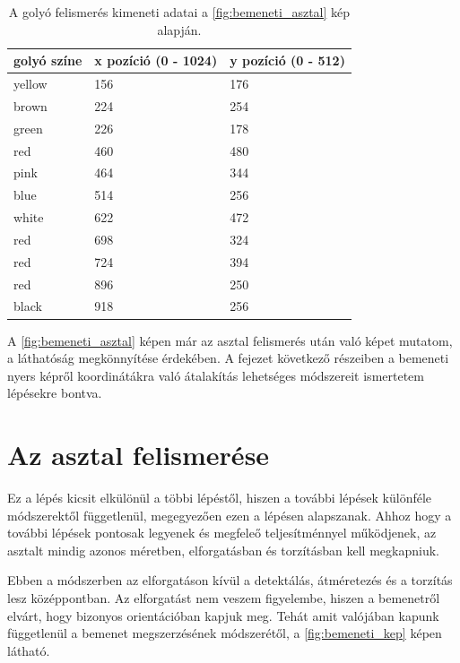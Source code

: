 \begin{table}[!ht]
    \caption{A golyó felismerés kimeneti adatai a \ref{fig:bemeneti_asztal} kép alapján.}
    \label{tab:felismert_koordinatak}
	\footnotesize
	\centering
	\begin{tabular}{ l l l }
		\toprule
		golyó színe & x pozíció (0 - 1024) & y pozíció (0 - 512) \\
		\midrule
		yellow & 156 & 176\\
        brown  & 224 & 254\\
        green  & 226 & 178\\
        red    & 460 & 480\\
        pink   & 464 & 344\\
        blue   & 514 & 256\\
        white  & 622 & 472\\
        red    & 698 & 324\\
        red    & 724 & 394\\
        red    & 896 & 250\\
        black  & 918 & 256\\
		\bottomrule
	\end{tabular}
\end{table}

\par A \ref{fig:bemeneti_asztal} képen már az asztal felismerés után való képet mutatom, a láthatóság megkönnyítése érdekében. A fejezet következő részeiben a bemeneti nyers képről koordinátákra való átalakítás lehetséges módszereit ismertetem lépésekre bontva.

\section{Az asztal felismerése}
Ez a lépés kicsit elkülönül a többi lépéstől, hiszen a további lépések különféle módszerektől függetlenül, megegyezően ezen a lépésen alapszanak. Ahhoz hogy a további lépések pontosak legyenek és megfeleő teljesítménnyel működjenek, az asztalt mindig azonos méretben, elforgatásban és torzításban kell megkapniuk.
\par Ebben a módszerben az elforgatáson kívül a detektálás, átméretezés és a torzítás lesz középpontban. Az elforgatást nem veszem figyelembe, hiszen a bemenetről elvárt, hogy bizonyos orientációban kapjuk meg. Tehát amit valójában kapunk függetlenül a bemenet megszerzésének módszerétől, a \ref{fig:bemeneti_kep} képen látható.

